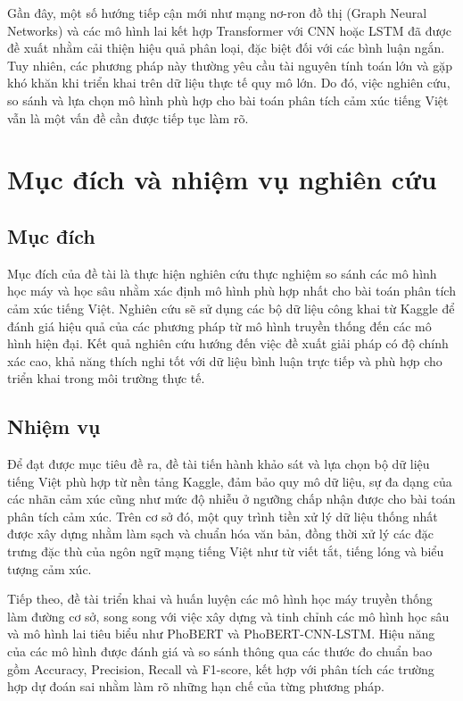 \documentclass[14pt, a4paper]{report}
\begin{document}
Gần đây, một số hướng tiếp cận mới như mạng nơ-ron đồ thị (Graph Neural Networks) và các mô hình lai kết hợp Transformer với CNN hoặc LSTM đã được đề xuất nhằm cải thiện hiệu quả phân loại, đặc biệt đối với các bình luận ngắn. Tuy nhiên, các phương pháp này thường yêu cầu tài nguyên tính toán lớn và gặp khó khăn khi triển khai trên dữ liệu thực tế quy mô lớn. Do đó, việc nghiên cứu, so sánh và lựa chọn mô hình phù hợp cho bài toán phân tích cảm xúc tiếng Việt vẫn là một vấn đề cần được tiếp tục làm rõ.

\section{Mục đích và nhiệm vụ nghiên cứu}

\subsection{Mục đích}

Mục đích của đề tài là thực hiện nghiên cứu thực nghiệm so sánh các mô hình học máy và học sâu nhằm xác định mô hình phù hợp nhất cho bài toán phân tích cảm xúc tiếng Việt. Nghiên cứu sẽ sử dụng các bộ dữ liệu công khai từ Kaggle để đánh giá hiệu quả của các phương pháp từ mô hình truyền thống đến các mô hình hiện đại. Kết quả nghiên cứu hướng đến việc đề xuất giải pháp có độ chính xác cao, khả năng thích nghi tốt với dữ liệu bình luận trực tiếp và phù hợp cho triển khai trong môi trường thực tế.

\subsection{Nhiệm vụ}

Để đạt được mục tiêu đề ra, đề tài tiến hành khảo sát và lựa chọn bộ dữ liệu tiếng Việt phù hợp từ nền tảng Kaggle, đảm bảo quy mô dữ liệu, sự đa dạng của các nhãn cảm xúc cũng như mức độ nhiễu ở ngưỡng chấp nhận được cho bài toán phân tích cảm xúc. Trên cơ sở đó, một quy trình tiền xử lý dữ liệu thống nhất được xây dựng nhằm làm sạch và chuẩn hóa văn bản, đồng thời xử lý các đặc trưng đặc thù của ngôn ngữ mạng tiếng Việt như từ viết tắt, tiếng lóng và biểu tượng cảm xúc.

Tiếp theo, đề tài triển khai và huấn luyện các mô hình học máy truyền thống làm đường cơ sở, song song với việc xây dựng và tinh chỉnh các mô hình học sâu và mô hình lai tiêu biểu như PhoBERT và PhoBERT-CNN-LSTM. Hiệu năng của các mô hình được đánh giá và so sánh thông qua các thước đo chuẩn bao gồm Accuracy, Precision, Recall và F1-score, kết hợp với phân tích các trường hợp dự đoán sai nhằm làm rõ những hạn chế của từng phương pháp.
\end{document}
